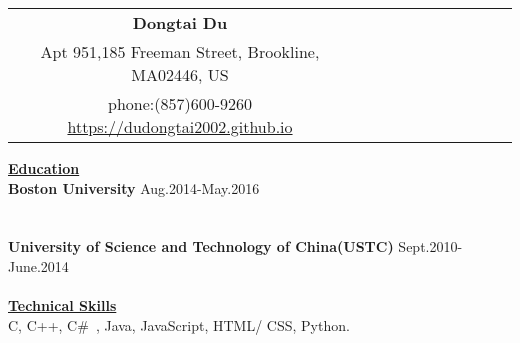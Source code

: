 \documentclass{resume} %
\begin{document}
 \small
\begin{spacing}{1}
\vspace{-0.5in}

\begin{center}
\begin{tabular}{*{11}{c}}
    \vspace{-0.5pt}
    \textbf{\Huge{Dongtai Du}}\\
    {\footnotesize Apt 951,185 Freeman Street, Brookline, MA02446, US} \\
    {\footnotesize phone:(857)600-9260} \hspace{1cm} {\footnotesize \url{https://dudongtai2002.github.io}}\hspace{1cm}{\footnotesize \url{Email:dudongtai2002@gmail.com}} \\
\end{tabular}

\uline{{\bf{\LARGE Education}}\hfill{\hspace{15cm}{}}} \\
\vspace{1mm}
{\bf Boston University \hspace{3cm} } \hfill {\hspace{2cm}Aug.2014-May.2016} \\
\hspace{3cm}
\\
\hspace{3.0cm}{Advanced Data Structure, Cloud Computing, Machine Learning}\\
{\bf University of Science and Technology of China(USTC) \hspace{1.8cm} } \hfill {Sept.2010-June.2014} \\
\hspace{-17.2cm}{B.S. in Physics} \hspace{1.66cm}\\

\vspace{3mm}
\uline{{\bf{\LARGE Technical Skills}}\hfill{\hspace{10cm}{}}} \\
\vspace{1mm}
\hspace{-6.0cm}{\bf Languages:} \hspace{2cm} {C, C++,  C\#\ , Java, JavaScript, HTML/ CSS, Python.} \\



\end{center}
\end{spacing}
\end{document}
